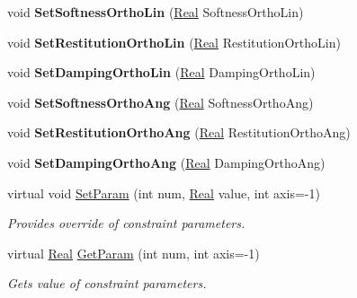 \begin{DoxyCompactItemize}
\item 
\hypertarget{classphys_1_1SliderConstraint_a9b8d07a013fdc6982d8334f60c347cf6}{
void {\bfseries SetSoftnessOrthoLin} (\hyperlink{namespacephys_af7eb897198d265b8e868f45240230d5f}{Real} SoftnessOrthoLin)}
\label{dc/d72/classphys_1_1SliderConstraint_a9b8d07a013fdc6982d8334f60c347cf6}

\item 
\hypertarget{classphys_1_1SliderConstraint_a3f02673645c8dd790a1ea445e566f4b6}{
void {\bfseries SetRestitutionOrthoLin} (\hyperlink{namespacephys_af7eb897198d265b8e868f45240230d5f}{Real} RestitutionOrthoLin)}
\label{dc/d72/classphys_1_1SliderConstraint_a3f02673645c8dd790a1ea445e566f4b6}

\item 
\hypertarget{classphys_1_1SliderConstraint_aa41383cdebe8c6343d5b16fecaebdc35}{
void {\bfseries SetDampingOrthoLin} (\hyperlink{namespacephys_af7eb897198d265b8e868f45240230d5f}{Real} DampingOrthoLin)}
\label{dc/d72/classphys_1_1SliderConstraint_aa41383cdebe8c6343d5b16fecaebdc35}

\item 
\hypertarget{classphys_1_1SliderConstraint_a4efe57a9656ad1686b3aff2b2f9643d0}{
void {\bfseries SetSoftnessOrthoAng} (\hyperlink{namespacephys_af7eb897198d265b8e868f45240230d5f}{Real} SoftnessOrthoAng)}
\label{dc/d72/classphys_1_1SliderConstraint_a4efe57a9656ad1686b3aff2b2f9643d0}

\item 
\hypertarget{classphys_1_1SliderConstraint_ada0a9eab21ef9ac48d711cb67c69a989}{
void {\bfseries SetRestitutionOrthoAng} (\hyperlink{namespacephys_af7eb897198d265b8e868f45240230d5f}{Real} RestitutionOrthoAng)}
\label{dc/d72/classphys_1_1SliderConstraint_ada0a9eab21ef9ac48d711cb67c69a989}

\item 
\hypertarget{classphys_1_1SliderConstraint_a85e6748c60d9b036bf53033233067586}{
void {\bfseries SetDampingOrthoAng} (\hyperlink{namespacephys_af7eb897198d265b8e868f45240230d5f}{Real} DampingOrthoAng)}
\label{dc/d72/classphys_1_1SliderConstraint_a85e6748c60d9b036bf53033233067586}

\item 
virtual void \hyperlink{classphys_1_1SliderConstraint_a1516aeff86674a969411b17a1847d115}{SetParam} (int num, \hyperlink{namespacephys_af7eb897198d265b8e868f45240230d5f}{Real} value, int axis=-\/1)
\begin{DoxyCompactList}\small\item\em Provides override of constraint parameters. \item\end{DoxyCompactList}\item 
virtual \hyperlink{namespacephys_af7eb897198d265b8e868f45240230d5f}{Real} \hyperlink{classphys_1_1SliderConstraint_a181393c2beec42bdebf7d1a17dfe7593}{GetParam} (int num, int axis=-\/1)
\begin{DoxyCompactList}\small\item\em Gets value of constraint parameters. \item\end{DoxyCompactList}\end{DoxyCompactItemize}
